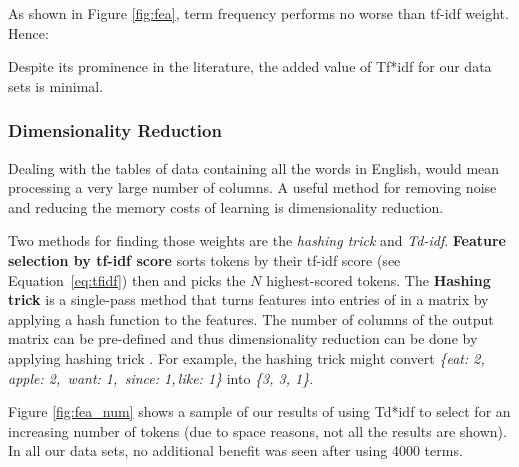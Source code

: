 \documentclass{sig-alternate-05-2015}
\newcommand{\eq}[1]{Equation~\ref{eq:#1}}
\theoremstyle{break}
\begin{document}

 
As shown in Figure \ref{fig:fea}, term frequency performs no worse     than tf-idf weight.  Hence:
\begin{lesson}
Despite its   prominence in the literature, the added value of Tf*idf for our
data sets is minimal.
\end{lesson}

\subsubsection{Dimensionality Reduction}


Dealing with the tables of data containing all the words in English, would mean processing a very large number of columns. A useful method for removing noise and reducing the 
memory costs of learning is dimensionality reduction. 

Two methods for finding those weights are the {\em hashing trick} and {\em Td-idf}.
\textbf{Feature selection by tf-idf score}  sorts tokens by their tf-idf score (see \eq{tfidf}) then and picks the $N$ highest-scored tokens. 
The \textbf{Hashing trick} is a single-pass method that turns features into 
entries of in a matrix by applying a hash function to the features. The number of columns of the output matrix can be pre-defined and thus dimensionality reduction can be done by applying hashing trick \cite{weinberger2009feature}. For
example,
the hashing trick might convert {\em {\em \{eat: 2,\, apple: 2,\, want: 1,\, since: 1,\,like: 1\}}} into {\em \{3, 3, 1\}}.   


Figure \ref{fig:fea_num}  shows a sample  of our results of using Td*idf to select for an increasing
number of tokens (due to space reasons, not all the results are shown). In all our data sets,
no additional benefit was seen after using 4000 terms. 
 
\end{document}
